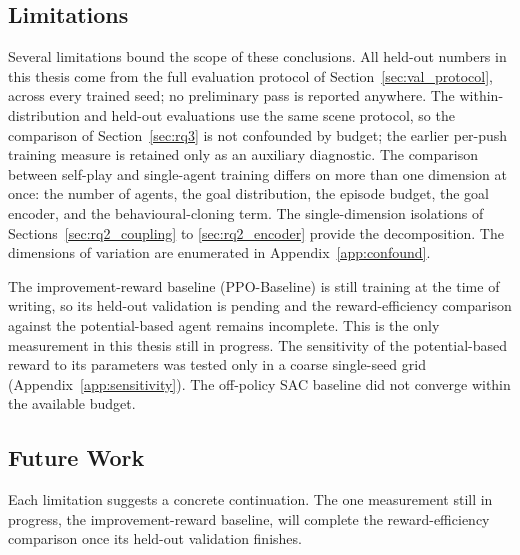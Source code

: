 \subsection{Limitations}
\label{sec:limitations}

Several limitations bound the scope of these conclusions. All held-out numbers
in this thesis come from the full evaluation protocol of
Section~\ref{sec:val_protocol}, across every trained seed; no preliminary pass is
reported anywhere. The within-distribution and held-out evaluations use the same
scene protocol, so the comparison of Section~\ref{sec:rq3} is not confounded by
budget; the earlier per-push training measure is retained only as an auxiliary
diagnostic. The comparison between self-play and single-agent
training differs on more than one dimension at once: the number of agents, the
goal distribution, the episode budget, the goal encoder, and the
behavioural-cloning term. The single-dimension isolations of
Sections~\ref{sec:rq2_coupling} to \ref{sec:rq2_encoder} provide the
decomposition. The dimensions of variation are
enumerated in Appendix~\ref{app:confound}.

The improvement-reward baseline (PPO-Baseline) is still training at the time of
writing, so its held-out validation is pending and the reward-efficiency
comparison against the potential-based agent remains incomplete. This is the
only measurement in this thesis still in progress. The sensitivity of the
potential-based reward to its
parameters was tested only in a coarse single-seed grid
(Appendix~\ref{app:sensitivity}). The off-policy SAC baseline did not converge
within the available budget.

\subsection{Future Work}
\label{sec:future_work}

Each limitation suggests a concrete continuation. The one measurement still in
progress, the improvement-reward baseline, will complete the reward-efficiency
comparison once its held-out validation finishes.

